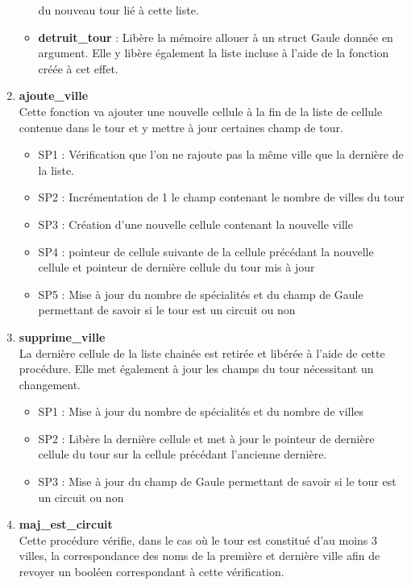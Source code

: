 \documentclass[a4paper, 11pt, oneside]{article}
\begin{document}
\begin{enumerate}
\begin{itemize}
        du nouveau tour lié à cette liste.
        \item \textbf{detruit\_tour} : Libère la mémoire allouer à un struct Gaule donnée en argument. 
        Elle y libère également la liste incluse à l'aide de la fonction créée à cet effet.
    \end{itemize}
    \item \textbf{ajoute\_ville}
    \\Cette fonction va ajouter une nouvelle cellule à la fin de la liste de cellule contenue dans le 
    tour et y mettre à jour certaines champ de tour.
    \begin{itemize}
        \item SP1 : Vérification que l’on ne rajoute pas la même ville que la dernière de la liste.
        \item SP2 : Incrémentation de 1 le champ contenant le nombre de villes du tour
        \item SP3 : Création d'une nouvelle cellule contenant la nouvelle ville
        \item SP4 : pointeur de cellule suivante de la cellule précédant la nouvelle cellule et pointeur 
        de dernière cellule du tour mis à jour
        \item SP5 : Mise à jour du nombre de spécialités et du champ de Gaule permettant de savoir
        si le tour est un circuit ou non
    \end{itemize}
    \item \textbf{supprime\_ville}
    \\La dernière cellule de la liste chainée est retirée et libérée à l'aide de cette procédure. Elle met 
    également à jour les champs du tour nécessitant un changement.
    \begin{itemize}
        \item SP1 : Mise à jour du nombre de spécialités et du nombre de villes
        \item SP2 : Libère la dernière cellule et met à jour le pointeur de dernière cellule du tour
        sur la cellule précédant l'ancienne dernière.
        \item SP3 : Mise à jour du champ de Gaule permettant de savoir si le tour est un circuit ou
        non
    \end{itemize}
    \item \textbf{maj\_est\_circuit}
    \\Cette procédure vérifie, dans le cas où le tour est constitué d'au moins 3 villes, la correspondance 
    des noms de la première et dernière ville afin de revoyer un booléen correspondant à cette vérification.

\end{enumerate}
\end{document}
